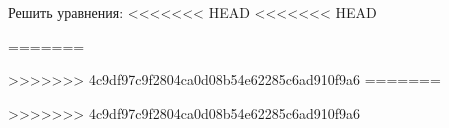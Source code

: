 \begin{ex}[type=multi]
	\begin{condition}
		Решить уравнения:
<<<<<<< HEAD
<<<<<<< HEAD
		\begin{enumcols}[itemcolumns=1]
=======
		\begin{enumcols}[itemcolumns=2]
>>>>>>> 4c9df97c9f2804ca0d08b54e62285c6ad910f9a6
=======
		\begin{enumcols}[itemcolumns=2]
>>>>>>> 4c9df97c9f2804ca0d08b54e62285c6ad910f9a6
			\item {}
			\item {}
			\item {}
			\item {}
			\item {}
			\item {}
			\item {}
			\item {}
			\item {}
			\item {}
			\item {}
			\item {}
			\item {}
			\item {}
			\item {}
			\item {}
			\item {}
			\item {}
			\item {}
			\item {}
			\item {}
			\item {}
			\item {}
			\item {}
			\item {}
			\item {}
			\item {}
			\item {}
			\item {}
			\item {}
			\item {}
			\item {}
			\item {}

\end{enumcols}
\end{enumcols}
\end{enumcols}
\end{condition}
\end{ex}
